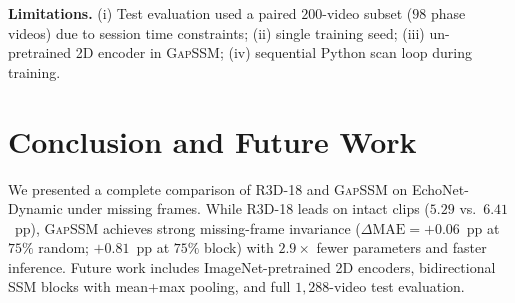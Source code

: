 \documentclass[conference]{IEEEtran}
\begin{document}
\textbf{Limitations.} (i) Test evaluation used a paired $200$-video subset ($98$ phase videos) due to session time constraints; (ii) single training seed; (iii) un-pretrained 2D encoder in \textsc{GapSSM}; (iv) sequential Python scan loop during training.

\section{Conclusion and Future Work}
We presented a complete comparison of R3D-18 and \textsc{GapSSM} on EchoNet-Dynamic under missing frames. While R3D-18 leads on intact clips ($5.29$ vs.\ $6.41$~pp), \textsc{GapSSM} achieves strong missing-frame invariance ($\Delta\text{MAE}=+0.06$~pp at $75\%$ random; $+0.81$~pp at $75\%$ block) with $2.9\times$ fewer parameters and faster inference. Future work includes ImageNet-pretrained 2D encoders, bidirectional SSM blocks with mean+max pooling, and full $1,288$-video test evaluation.



\end{document}
